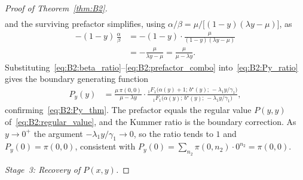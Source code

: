 \begin{proof}[Proof of Theorem~\ref{thm:B2}]
\begin{align}
    \label{eq:B2:beta_ratio}
\end{align}
and the surviving prefactor simplifies, using
$\alpha/\beta=\mu/\bigl[(1-y)(\lambda y-\mu)\bigr]$, as
\begin{align}
    -(1-y)\,\frac{\alpha}{\beta}
    &= -(1-y)\cdot\frac{\mu}{(1-y)(\lambda y-\mu)} \nonumber\\
    &= -\frac{\mu}{\lambda y-\mu} = \frac{\mu}{\mu-\lambda y}.
    \label{eq:B2:prefactor_combo}
\end{align}
Substituting~\eqref{eq:B2:beta_ratio}--\eqref{eq:B2:prefactor_combo}
into~\eqref{eq:B2:Py_ratio} gives the boundary generating function
\begin{align}
    P_y(y) &= \frac{\mu\,\pi(0,0)}{\mu-\lambda y}
    \cdot\frac{{}_1F_1\!\bigl(\alpha(y)+1;\,b^\star(y);\,-\lambda_1 y/\gamma_1\bigr)}
              {{}_1F_1\!\bigl(\alpha(y);\,b^\star(y);\,-\lambda_1 y/\gamma_1\bigr)},
    \label{eq:B2:Py}
\end{align}
confirming~\eqref{eq:B2:Py_thm}.  The prefactor equals the regular value $P(y,y)$
of~\eqref{eq:B2:regular_value}, and the Kummer ratio is the boundary correction.
As $y\to0^+$ the argument $-\lambda_1 y/\gamma_1\to0$, so the ratio tends to $1$ and
$P_y(0)=\pi(0,0)$, consistent with
$P_y(0)=\sum_{n_2}\pi(0,n_2)\cdot0^{n_2}=\pi(0,0)$.

\medskip\noindent\textit{Stage~3: Recovery of $P(x,y)$.}
\medskip


\end{proof}
